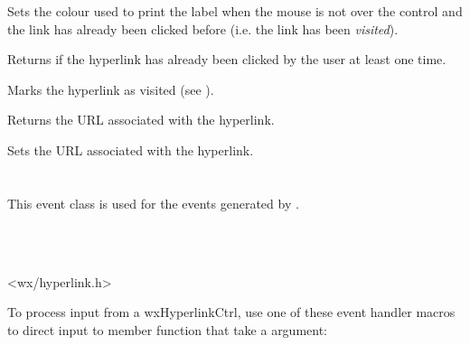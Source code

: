 
Sets the colour used to print the label when the mouse is not over the control
and the link has already been clicked before (i.e. the link has been {\it visited}).


\label{wxhyperlinkctrlgetvisited}


Returns \true if the hyperlink has already been clicked by the user at least one time.


\label{wxhyperlinkctrlsetvisited}


Marks the hyperlink as visited (see ).


\label{wxhyperlinkctrlgeturl}


Returns the URL associated with the hyperlink.


\label{wxhyperlinkctrlseturl}


Sets the URL associated with the hyperlink.






\section{}\label{wxhyperlinkevent}

This event class is used for the events generated by
.


\\
\\


<wx/hyperlink.h>


To process input from a wxHyperlinkCtrl, use one of these event handler macros to
direct input to member function that take a
 argument:

